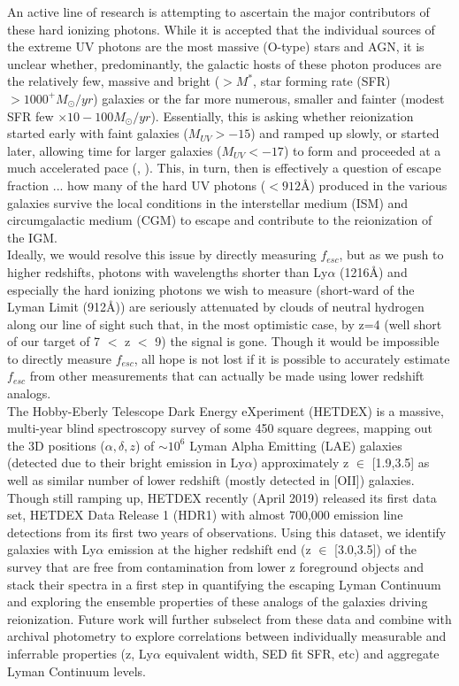 \documentclass{aastex62}
\begin{document}
An active line of research is attempting to ascertain the major contributors of these hard ionizing photons. While it is accepted that the individual sources of the extreme UV photons are the most massive (O-type) stars and AGN, it is unclear whether, predominantly, the galactic hosts of these photon produces are the relatively few, massive and bright ($> M^{*}$, star forming rate (SFR) $> 1000^{+} M_{\odot}/yr$) galaxies or the far more numerous, smaller and fainter (modest SFR few $\times 10 - 100 M_{\odot}/yr$). Essentially, this is asking whether reionization started early with faint galaxies ($M_{UV} > -15$) and ramped up slowly, or started later, allowing time for larger galaxies ($M_{UV} < -17$) to form and proceeded at a much accelerated pace (\cite{Livermore}, \cite{Finkelstein}). This, in turn, then is effectively a question of escape fraction ... how many of the hard UV photons ($< 912\mbox{\AA}$) produced in the various galaxies survive the local conditions in the interstellar medium (ISM) and circumgalactic medium (CGM) to escape and contribute to the reionization of the IGM.\\


Ideally, we would resolve this issue by directly measuring $f_{esc}$, but as we push to higher redshifts, photons with wavelengths shorter than Ly$\alpha$ (1216$\mbox{\AA}$) and especially the hard ionizing photons we wish to measure (short-ward of the Lyman Limit (912$\mbox{\AA}$)) are seriously attenuated by clouds of neutral hydrogen along our line of sight such that, in the most optimistic case, by z=4 (well short of our target of 7 $<$ z $<$ 9) the signal is gone. Though it would be impossible to directly measure $f_{esc}$, all hope is not lost if it is possible to accurately estimate $f_{esc}$ from other measurements that can actually be made using lower redshift analogs.\\


The Hobby-Eberly Telescope Dark Energy eXperiment (HETDEX) is a massive, multi-year blind spectroscopy survey of some 450 square degrees, mapping out the 3D positions ($\alpha,\delta,z$) of $\sim 10^6$ Lyman Alpha Emitting (LAE) galaxies (detected due to their bright emission in Ly$\alpha$) approximately z $\in$ [1.9,3.5] as well as similar number of lower redshift (mostly detected in [OII]) galaxies. Though still ramping up, HETDEX recently (April 2019) released its first data set, HETDEX Data Release 1 (HDR1) with almost 700,000 emission line detections from its first two years of observations. Using this dataset, we identify galaxies with Ly$\alpha$ emission at the higher redshift end (z $\in$ [3.0,3.5]) of the survey that are free from contamination from lower z foreground objects and stack their spectra in a first step in quantifying the escaping Lyman Continuum and exploring the ensemble properties of these analogs of the galaxies driving reionization. Future work will further subselect from these data and combine with archival photometry to explore correlations between individually measurable and inferrable properties (z, Ly$\alpha$ equivalent width, SED fit SFR, etc) and aggregate Lyman Continuum levels.\\
\end{document}
